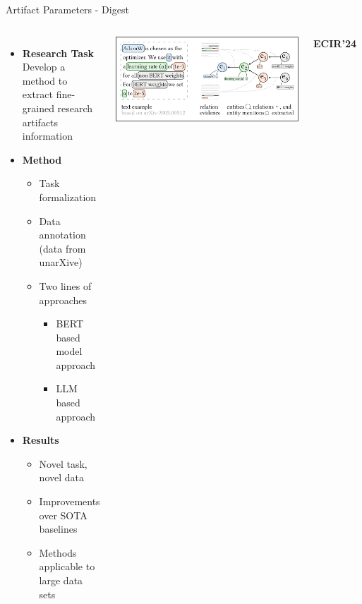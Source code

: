 \documentclass[en,16:9,smallfoot]{sdqbeamer}
\begin{document}
   \begin{frame}{Artifact Parameters - Digest}

   \begin{columns}
        \begin{itemize}
            \item \textbf{Research Task}\\Develop a method to extract fine-grained research artifacts information
            \item \textbf{Method}
            \begin{itemize}
                \item Task formalization
                \item Data annotation {\color{lightgrey}(data from unarXive)}
                \item Two lines of approaches
                \begin{itemize}
                    \item BERT based model approach
                    \item LLM based approach
                \end{itemize}
            \end{itemize}
            \item \textbf{Results}
            \begin{itemize}
                \item Novel task, novel data
                \item Improvements over SOTA baselines
                \item Methods applicable to large data sets
            \end{itemize}
        \end{itemize}
            \includegraphics[width=\linewidth]{imgs/hyperpie_schema}
           \begin{infobox-pub-small}
           \textbf{ECIR'24}~\cite{Saier2024HyperPIE}
           \end{infobox-pub-small}
   \end{columns}
   \end{frame}
\end{document}
